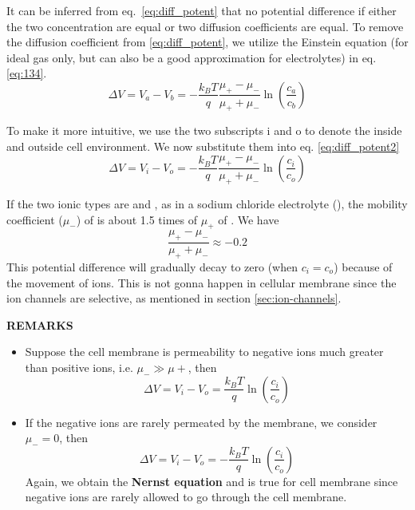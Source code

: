 It can be inferred from eq.~\eqref{eq:diff_potent} that no potential
difference if either the two concentration are equal or two diffusion
coefficients are equal.  To remove the diffusion coefficient from
\eqref{eq:diff_potent}, we utilize the Einstein equation (for ideal
gas only, but can also be a good approximation for electrolytes) in eq. \eqref{eq:134}.
\begin{equation}\label{eq:diff_potent2}
  \Delta V = V_a - V_b = -\frac{k_BT}{q} \frac{\mu_+ -
    \mu_-}{\mu_+ + \mu_-} \ln \left( \frac{c_a}{c_b} \right)
\end{equation}

To make it more intuitive, we use the two subscripts i and o to denote
the inside and outside cell environment. We now substitute them into
eq. \eqref{eq:diff_potent2}
\begin{equation}
  \Delta V = V_i - V_o = - \frac{k_BT}{q} \frac{\mu_+ -
    \mu_-}{\mu_+ + \mu_-} \ln \left( \frac{c_i}{c_o} \right)
\end{equation}


If the two ionic types are  and , as in a sodium
chloride electrolyte (), the mobility coefficient ($\mu_-$)
of  is about 1.5 times of $\mu_+$ of .  We have
\begin{equation}
  \label{eq:133}
  \frac{\mu_+ - \mu_-}{\mu_+ + \mu_-} \approx -0.2
\end{equation}
This potential difference will gradually decay to zero (when $c_i =
c_o$) because of the movement of ions. This is not gonna happen in
cellular membrane since the ion channels are selective, as mentioned
in section \ref{sec:ion-channels}.

{\bf REMARKS}
\begin{itemize}
\item Suppose the cell membrane is permeability to negative ions much
  greater than positive ions, i.e. $\mu_- \gg \mu+$, then
  \begin{equation}
    \Delta V = V_i - V_o = \frac{k_BT}{q} \ln \left( \frac{c_i}{c_o} \right)
  \end{equation}
\item If the negative ions are rarely permeated by the membrane, we
  consider $\mu_- = 0$, then
  \begin{equation}
    \Delta V = V_i - V_o = -\frac{k_BT}{q} \ln \left( \frac{c_i}{c_o} \right)
  \end{equation}
  Again, we obtain the {\bf Nernst equation} and is true for cell
  membrane since negative ions are rarely allowed to go through the
  cell membrane.

\end{itemize}



